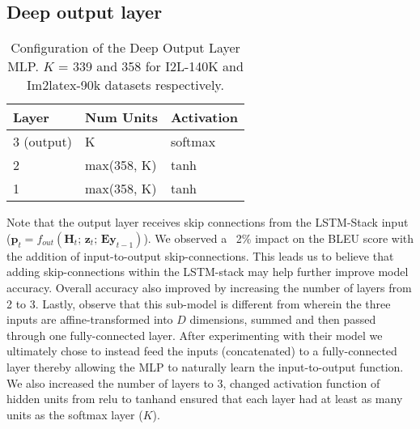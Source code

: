 \documentclass{article}
\begin{document}
\subsection{Deep output layer}
\label{output-comments}
\begin{wraptable}{r}{0.5\textwidth}
	\caption[Output Layer Configuration]{Configuration of the Deep Output Layer MLP. $K$ = 339 and 358 for I2L-140K and Im2latex-90k datasets respectively.}
	\begin{tabular}{lll}
		\textbf{Layer} & \textbf{Num Units} & \textbf{Activation}\\
		\hline
		3 (output) & K & softmax \\
		2 & max(358, K) & tanh \\
		1 & max(358, K) & tanh
	\end{tabular}
	\centering
	\label{table-output-layer}
\end{wraptable}
Note that the output layer receives skip connections from the LSTM-Stack input ($\boldsymbol{p}_t = f_{out}(\boldsymbol{H}_t; \, \boldsymbol{z}_t; \, \boldsymbol{Ey}_{t-1})$). We observed a ~2\% impact on the BLEU score with the addition of input-to-output skip-connections. This leads us to believe that adding skip-connections within the LSTM-stack may help further improve model accuracy. Overall accuracy also improved by increasing the number of layers from 2 to 3. Lastly, observe that this sub-model is different from \citet{Xu2015ShowAA} wherein the three inputs are affine-transformed into $D$ dimensions, summed and then passed through one fully-connected layer. After experimenting with their model we ultimately chose to instead feed the inputs (concatenated) to a fully-connected layer thereby allowing the MLP to naturally learn the input-to-output function. We also increased the number of layers to 3, changed activation function of hidden units from relu to tanh\footnotemark[101] and ensured that each layer had at least as many units as the softmax layer ($K$).
\end{document}
